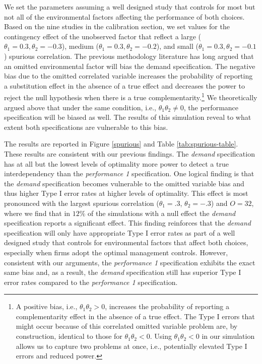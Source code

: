\documentclass[12pt]{article}
\begin{document}


We set the parameters assuming a well designed study that controls for most but not all of the environmental factors affecting the performance of both choices. Based on the nine studies in the calibration section, we set values for the contingency effect of the unobserved factor that reflect a large ($\theta_1 = 0.3, \theta_2 = -0.3$), medium ($\theta_1 = 0.3, \theta_2 = -0.2$), and small ($\theta_1 = 0.3, \theta_2 = -0.1$) spurious correlation. The previous methodology literature has long argued that an omitted environmental factor will bias the demand specification. The negative bias due to the omitted correlated variable increases the probability of reporting a substitution effect in the absence of a true effect and decreases the power to reject the null hypothesis when there is a true complementarity.\footnote{A positive bias, i.e., $\theta_1 \theta_2 > 0$, increases the probability of reporting a complementarity effect in the absence of a true effect. The Type I errors that might occur because of this correlated omitted variable problem are, by construction, identical to those for $\theta_1 \theta_2 < 0$. Using $\theta_1 \theta_2 < 0$ in our simulation allows us to capture two problems at once, i.e., potentially elevated Type I errors and reduced power.}  We theoretically argued above that under the same condition, i.e., $\theta_1 \theta_2 \neq 0$, the performance specification will be biased as well. The results of this simulation reveal to what extent both specifications are vulnerable to this bias.

The results are reported in Figure \ref{spurious} and Table \ref{tab:spurious-table}. These results are consistent with our previous findings. The \emph{demand} specification has at all but the lowest levels of optimality more power to detect a true interdependency than the \emph{performance 1} specification. One logical finding is that the \emph{demand} specification becomes vulnerable to the omitted variable bias and thus higher Type I error rates at higher levels of optimality. This effect is most pronounced with the largest spurious correlation (\(\theta_1 = .3\), \(\theta_2 = -.3\)) and \(O = 32\), where we find that in $12\%$ of the simulations with a null effect the \emph{demand} specification reports a significant effect. This finding reinforces that the \emph{demand} specification will only have appropriate Type I error rates as part of a well designed study that controls for environmental factors that affect both choices, especially when firms adopt the optimal management controls. However, consistent with our arguments, the \emph{performance 1} specification exhibits the exact same bias and, as a result, the \emph{demand} specification still has superior Type I error rates compared to the \emph{performance 1} specification.
\end{document}
